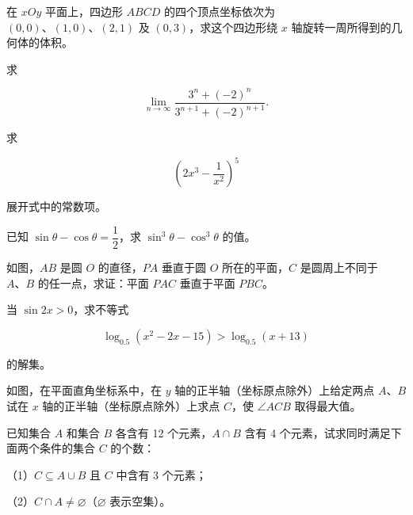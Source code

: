 \begin{question}
在 $xOy$ 平面上，四边形 $ABCD$ 的四个顶点坐标依次为 $(0,0)\text{、}(1,0)\text{、}(2,1)$ 及 $(0,3)$，求这个四边形绕 $x$ 轴旋转一周所得到的几何体的体积。

\end{question}
\begin{question}
求

\nopagebreak[4]
\[
\lim_{n\to\infty}\frac{3^n+(-2)^n}{3^{n+1}+(-2)^{n+1}}.
\]

\end{question}
\begin{question}
求

\nopagebreak[4]
\[
\left(2x^3-\frac1{x^2}\right)^5
\]

展开式中的常数项。

\end{question}
\begin{question}
已知 $\sin\theta-\cos\theta=\dfrac12$，求 $\sin^3\theta-\cos^3\theta$ 的值。

\Needspace{0.4\textheight}
\end{question}
\begin{question}
如图，$AB$ 是圆 $O$ 的直径，$PA$ 垂直于圆 $O$ 所在的平面，$C$ 是圆周上不同于 $A\text{、}B$ 的任一点，求证：平面 $PAC$ 垂直于平面 $PBC$。
\nopagebreak[4]
\begin{center}\end{center}
\nopagebreak[4]
\end{question}
\begin{question}
当 $\sin2x>0$，求不等式

\nopagebreak[4]
\[
\log_{0.5}(x^2-2x-15)>\log_{0.5}(x+13)
\]

的解集。

\Needspace{0.4\textheight}
\end{question}
\begin{question}
如图，在平面直角坐标系中，在 $y$ 轴的正半轴（坐标原点除外）上给定两点 $A\text{、}B$ 试在 $x$ 轴的正半轴（坐标原点除外）上求点 $C$，使 $\angle ACB$ 取得最大值。
\nopagebreak[4]
\begin{center}\end{center}
\nopagebreak[4]
\end{question}
\begin{question}
已知集合 $A$ 和集合 $B$ 各含有 12 个元素，$A\cap B$ 含有 4 个元素，试求同时满足下面两个条件的集合 $C$ 的个数：

（1）$C\subseteq A\cup B$ 且 $C$ 中含有 3 个元素；

（2）$C\cap A\ne\varnothing$（$\varnothing$ 表示空集）。

\end{question}
